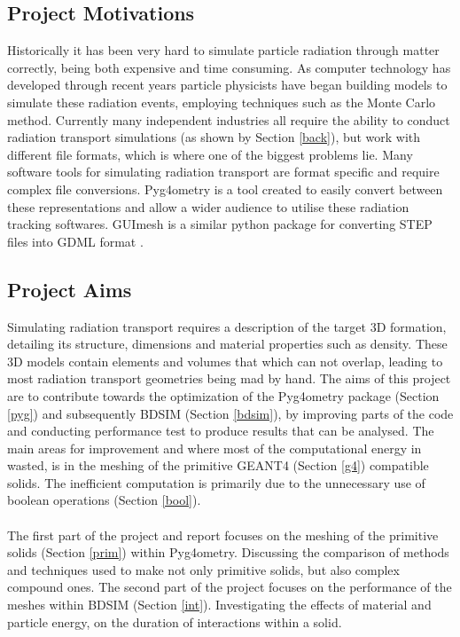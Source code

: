 \documentclass[12pt,a4paper]{article}
\begin{document}
\subsection{Project Motivations}
\label{motiv}
\noindent Historically it has been very hard to simulate particle radiation through matter correctly, being both expensive and time consuming. As computer technology has developed through recent years particle physicists have began building models to simulate these radiation events, employing techniques such as the Monte Carlo method. Currently many independent industries all require the ability to conduct radiation transport simulations (as shown by Section \ref{back}), but work with different file formats, which is where one of the biggest problems lie. Many software tools for simulating radiation transport are format specific and require complex file conversions. Pyg4ometry is a tool created to easily convert between these representations and allow a wider audience to utilise these radiation tracking softwares. GUImesh is a similar python package for converting STEP files into GDML format \cite{meh}.

\subsection{Project Aims}
\label{aim}
Simulating radiation transport requires a description of the target 3D formation, detailing its structure, dimensions and material properties such as density. These 3D models contain elements and volumes that which can not overlap, leading to most radiation transport geometries being mad by hand.
The aims of this project are to contribute towards the optimization of the Pyg4ometry package (Section \ref{pyg}) and subsequently BDSIM (Section \ref{bdsim}), by improving parts of the code and conducting performance test to produce results that can be analysed. The main areas for improvement and where most of the computational energy in wasted, is in the meshing of the primitive GEANT4 (Section \ref{g4}) compatible solids. The inefficient computation is primarily due to the unnecessary use of boolean operations (Section \ref{bool}).
\\\\
The first part of the project and report focuses on the meshing of the primitive solids (Section \ref{prim}) within Pyg4ometry. Discussing the comparison of methods and techniques used to make not only primitive solids, but also complex compound ones. The second part of the project focuses on the performance of the meshes within BDSIM (Section \ref{int}). Investigating the effects of material and particle energy, on the duration of interactions within a solid.
\end{document}
